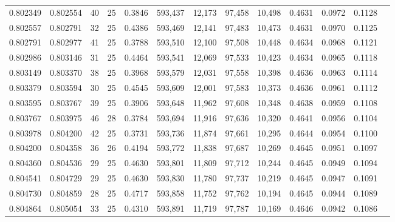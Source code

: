 \begin{tabular}{rrrrrrrrrrrrr}
0.802349 & 0.802554 &    40 &  25 &                                     0.3846 & 593,437 &  12,173 &  97,458 &  10,498 & 0.4631 & 0.0972 & 0.1128 \\
0.802557 & 0.802791 &    32 &  25 &                                     0.4386 & 593,469 &  12,141 &  97,483 &  10,473 & 0.4631 & 0.0970 & 0.1125 \\
0.802791 & 0.802977 &    41 &  25 &                                     0.3788 & 593,510 &  12,100 &  97,508 &  10,448 & 0.4634 & 0.0968 & 0.1121 \\
0.802986 & 0.803146 &    31 &  25 &                                     0.4464 & 593,541 &  12,069 &  97,533 &  10,423 & 0.4634 & 0.0965 & 0.1118 \\
0.803149 & 0.803370 &    38 &  25 &                                     0.3968 & 593,579 &  12,031 &  97,558 &  10,398 & 0.4636 & 0.0963 & 0.1114 \\
0.803379 & 0.803594 &    30 &  25 &                                     0.4545 & 593,609 &  12,001 &  97,583 &  10,373 & 0.4636 & 0.0961 & 0.1112 \\
0.803595 & 0.803767 &    39 &  25 &                                     0.3906 & 593,648 &  11,962 &  97,608 &  10,348 & 0.4638 & 0.0959 & 0.1108 \\
0.803767 & 0.803975 &    46 &  28 &                                     0.3784 & 593,694 &  11,916 &  97,636 &  10,320 & 0.4641 & 0.0956 & 0.1104 \\
0.803978 & 0.804200 &    42 &  25 &                                     0.3731 & 593,736 &  11,874 &  97,661 &  10,295 & 0.4644 & 0.0954 & 0.1100 \\
0.804200 & 0.804358 &    36 &  26 &                                     0.4194 & 593,772 &  11,838 &  97,687 &  10,269 & 0.4645 & 0.0951 & 0.1097 \\
0.804360 & 0.804536 &    29 &  25 &                                     0.4630 & 593,801 &  11,809 &  97,712 &  10,244 & 0.4645 & 0.0949 & 0.1094 \\
0.804541 & 0.804729 &    29 &  25 &                                     0.4630 & 593,830 &  11,780 &  97,737 &  10,219 & 0.4645 & 0.0947 & 0.1091 \\
0.804730 & 0.804859 &    28 &  25 &                                     0.4717 & 593,858 &  11,752 &  97,762 &  10,194 & 0.4645 & 0.0944 & 0.1089 \\
0.804864 & 0.805054 &    33 &  25 &                                     0.4310 & 593,891 &  11,719 &  97,787 &  10,169 & 0.4646 & 0.0942 & 0.1086 \\

\end{tabular}
